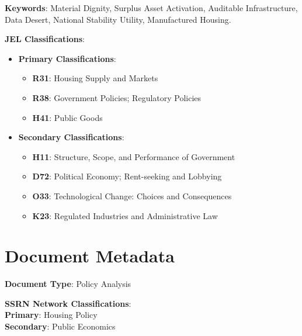 \documentclass[
  12pt,
]{article}
\providecommand{\tightlist}{%
  \setlength{\itemsep}{0pt}\setlength{\parskip}{0pt}}
\begin{document}
\textbf{Keywords}: Material Dignity, Surplus Asset Activation, Auditable Infrastructure, Data Desert, National Stability Utility, Manufactured Housing.

\textbf{JEL Classifications}:

\begin{itemize}
\tightlist
\item
  \textbf{Primary Classifications}:

  \begin{itemize}
  \tightlist
  \item
    \textbf{R31}: Housing Supply and Markets
  \item
    \textbf{R38}: Government Policies; Regulatory Policies
  \item
    \textbf{H41}: Public Goods
  \end{itemize}
\item
  \textbf{Secondary Classifications}:

  \begin{itemize}
  \tightlist
  \item
    \textbf{H11}: Structure, Scope, and Performance of Government
  \item
    \textbf{D72}: Political Economy; Rent-seeking and Lobbying
  \item
    \textbf{O33}: Technological Change: Choices and Consequences
  \item
    \textbf{K23}: Regulated Industries and Administrative Law
  \end{itemize}
\end{itemize}

\hypertarget{document-metadata}{%
\section{Document Metadata}\label{document-metadata}}

\textbf{Document Type}: Policy Analysis

\textbf{SSRN Network Classifications}:\\
\hspace*{0.333em}\hspace*{0.333em}\hspace*{0.333em}\hspace*{0.333em} \textbf{Primary}: Housing Policy\\
\hspace*{0.333em}\hspace*{0.333em}\hspace*{0.333em}\hspace*{0.333em} \textbf{Secondary}: Public Economics
\end{document}
